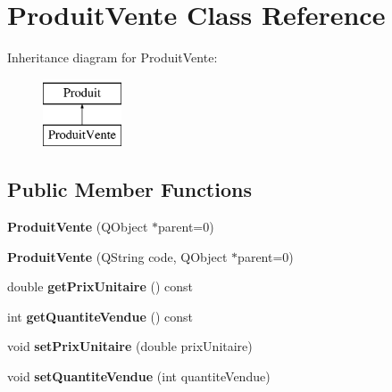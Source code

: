 \hypertarget{class_produit_vente}{
\section{ProduitVente Class Reference}
\label{class_produit_vente}
}
Inheritance diagram for ProduitVente:\begin{figure}[H]
\begin{center}
\leavevmode
\includegraphics[height=2.000000cm]{class_produit_vente}
\end{center}
\end{figure}
\subsection*{Public Member Functions}
\begin{DoxyCompactItemize}
\item 
\hypertarget{class_produit_vente_ae00ba963c49b84270e333143f60c95e3}{
{\bfseries ProduitVente} (QObject $\ast$parent=0)}
\label{class_produit_vente_ae00ba963c49b84270e333143f60c95e3}

\item 
\hypertarget{class_produit_vente_afb2bfa47829419e0401f0cddbcd12163}{
{\bfseries ProduitVente} (QString code, QObject $\ast$parent=0)}
\label{class_produit_vente_afb2bfa47829419e0401f0cddbcd12163}

\item 
\hypertarget{class_produit_vente_a552ea383ed75bf1e7d9da4602320850d}{
double {\bfseries getPrixUnitaire} () const }
\label{class_produit_vente_a552ea383ed75bf1e7d9da4602320850d}

\item 
\hypertarget{class_produit_vente_a588f1f05e08c421ab0da6de943202768}{
int {\bfseries getQuantiteVendue} () const }
\label{class_produit_vente_a588f1f05e08c421ab0da6de943202768}

\item 
\hypertarget{class_produit_vente_a9fa039eab6b9c6a3142bb8119a876349}{
void {\bfseries setPrixUnitaire} (double prixUnitaire)}
\label{class_produit_vente_a9fa039eab6b9c6a3142bb8119a876349}

\item 
\hypertarget{class_produit_vente_a936ee8f739cac9736d78fdd6a2c969c4}{
void {\bfseries setQuantiteVendue} (int quantiteVendue)}
\label{class_produit_vente_a936ee8f739cac9736d78fdd6a2c969c4}

\end{DoxyCompactItemize}

